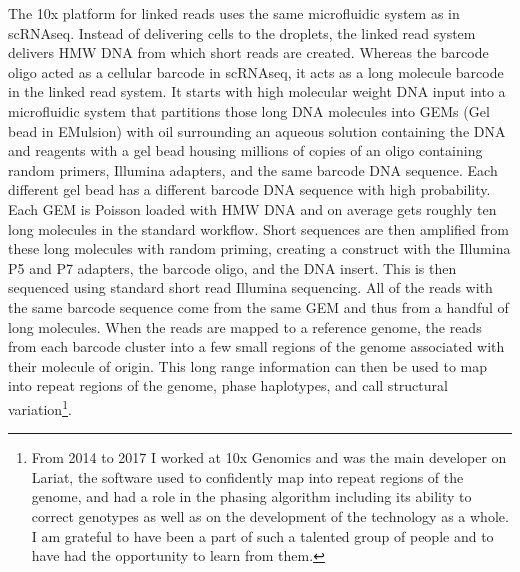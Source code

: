 \par{
The 10x platform for linked reads uses the same microfluidic system as in scRNAseq. Instead of delivering cells to the droplets, the linked read system delivers HMW DNA from which short reads are created. Whereas the barcode oligo acted as a cellular barcode in scRNAseq, it acts as a long molecule barcode in the linked read system. It starts with high molecular weight DNA input into a microfluidic system that partitions those long DNA molecules into GEMs (Gel bead in EMulsion) with oil surrounding an aqueous solution containing the DNA and reagents with a gel bead housing millions of copies of an oligo containing random primers, Illumina adapters, and the same barcode DNA sequence. Each different gel bead has a different barcode DNA sequence with high probability. Each GEM is Poisson loaded with HMW DNA and on average gets roughly ten long molecules in the standard workflow. Short sequences are then amplified from these long molecules with random priming, creating a construct with the Illumina P5 and P7 adapters, the barcode oligo, and the DNA insert. This is then sequenced using standard short read Illumina sequencing. All of the reads with the same barcode sequence come from the same GEM and thus from a handful of long molecules. When the reads are mapped to a reference genome, the reads from each barcode cluster into a few small regions of the genome associated with their molecule of origin. This long range information can then be used to map into repeat regions of the genome, phase haplotypes, and call structural variation\cite{10xlinked}\footnote{From 2014 to 2017 I worked at 10x Genomics and was the main developer on Lariat, the software used to confidently map into repeat regions of the genome, and had a role in the phasing algorithm including its ability to correct genotypes as well as on the development of the technology as a whole. I am grateful to have been a part of such a talented group of people and to have had the opportunity to learn from them.}.
}


